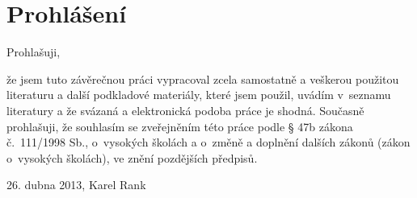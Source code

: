 \section*{Prohlášení}
Prohlašuji,

že jsem tuto závěrečnou práci vypracoval zcela samostatně a veškerou použitou literaturu a další podkladové materiály, které jsem použil, uvádím v~seznamu literatury a že svázaná a elektronická podoba práce je shodná. Současně prohlašuji, že souhlasím se zveřejněním této práce podle § 47b zákona č.~111/1998 Sb., o~vysokých školách a o~změně a doplnění dalších zákonů (zákon o~vysokých školách), ve znění pozdějších předpisů.

\bigskip
\begin{flushright}
26. dubna 2013, Karel Rank
\end{flushright}

\newpage